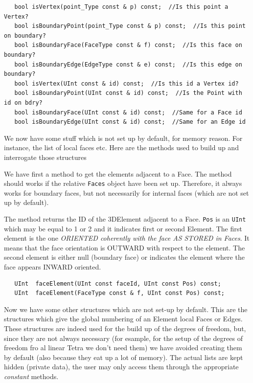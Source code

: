 \begin{verbatim}
   bool isVertex(point_Type const & p) const;  //Is this point a Vertex?
   bool isBoundaryPoint(point_Type const & p) const;  //Is this point on boundary?
   bool isBoundaryFace(FaceType const & f) const;  //Is this face on boundary?
   bool isBoundaryEdge(EdgeType const & e) const;  //Is this edge on boundary?
   bool isVertex(UInt const & id) const;  //Is this id a Vertex id?
   bool isBoundaryPoint(UInt const & id) const;  //Is the Point with id on bdry?
   bool isBoundaryFace(UInt const & id) const;  //Same for a Face id
   bool isBoundaryEdge(UInt const & id) const;  //Same for an Edge id
\end{verbatim}
We now have some stuff which is not set up by default, for memory
reason. For instance, the list of local faces etc. Here are the
methods used to build up and interrogate those structures

We have first a method to get the elements adjacent to a Face. The
method should works if the relative \texttt{Faces} object have been
set up. Therefore, it always works for boundary faces, but not
necessarily for internal faces (which are not set up by default).
 
The method returns the ID of the 3DElement adjacent to a Face.
\texttt{Pos} is an \texttt{UInt} which may be equal to 1 or 2 and it
indicates first or second Element. The first element is the one
\emph{ORIENTED coherently with the face AS STORED in Faces}. It means that
the face orientation is OUTWARD with respect to the element. The second
element is either null (boundary face) or indicates the element where
the face appears INWARD oriented.

\begin{verbatim}
   UInt  faceElement(UInt const faceId, UInt const Pos) const; 
   UInt  faceElement(FaceType const & f, UInt const Pos) const;  
\end{verbatim}

Now we have some other structures which are not set-up by default.  This
are the structures which give the global numbering of an Element local
Faces or Edges. These structures are indeed used for the build up of the
degrees of freedom, but, since they are not always necessary (for
esample, for the setup of the degrees of freedom fro al linear Tetra we
don't need them) we have avoided creating them by default (also because
they eat up a lot of memory).  The actual lists are kept hidden (private
data), the user may only access them through the appropriate
\emph{constant} methods.


